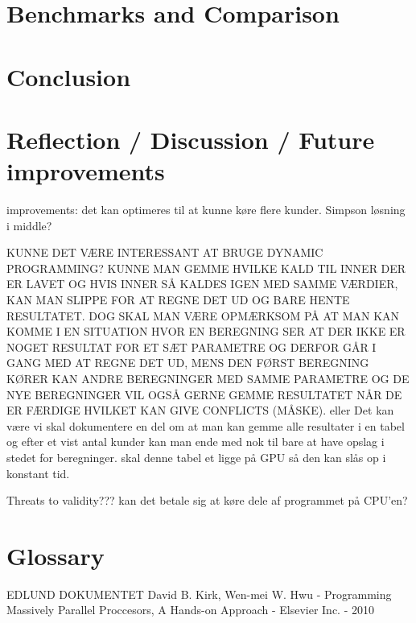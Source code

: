 \documentclass[12pt]{article}
\begin{document}
	
		
	\section{Benchmarks and Comparison}
		
	
		
	\section{Conclusion}
	
	
	
	\section{Reflection / Discussion / Future improvements}
	improvements:
	det kan optimeres til at kunne køre flere kunder.
	Simpson løsning i middle?
	
	KUNNE DET VÆRE INTERESSANT AT BRUGE DYNAMIC PROGRAMMING?
	KUNNE MAN GEMME HVILKE KALD TIL INNER DER ER LAVET OG HVIS INNER SÅ KALDES IGEN MED SAMME VÆRDIER, KAN MAN SLIPPE FOR AT REGNE DET UD OG BARE HENTE RESULTATET. DOG SKAL MAN VÆRE OPMÆRKSOM PÅ AT MAN KAN KOMME I EN SITUATION HVOR EN BEREGNING SER AT DER IKKE ER NOGET RESULTAT FOR ET SÆT PARAMETRE OG DERFOR GÅR I GANG MED AT REGNE DET UD, MENS DEN FØRST BEREGNING KØRER KAN ANDRE BEREGNINGER MED SAMME PARAMETRE OG DE NYE BEREGNINGER VIL OGSÅ GERNE GEMME RESULTATET NÅR DE ER FÆRDIGE HVILKET KAN GIVE CONFLICTS (MÅSKE).
	eller
	Det kan være vi skal dokumentere en del om at man kan gemme alle resultater i en tabel og efter et vist antal kunder kan man ende med nok til bare at have opslag i stedet for beregninger. skal denne tabel et ligge på GPU så den kan slås op i konstant tid.
		
	
	Threats to validity???
	kan det betale sig at køre dele af programmet på CPU'en?
		
	\section{Glossary}
	
	
		
	\begin{thebibliography}{9}
			 EDLUND DOKUMENTET
			 David B. Kirk, Wen-mei W. Hwu - Programming Massively Parallel Proccesors, A Hands-on Approach - Elsevier Inc. - 2010
	\end{thebibliography}
	
\end{document}
